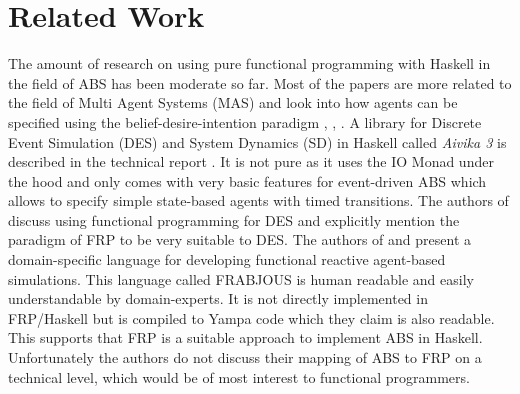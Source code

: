 \section{Related Work}
\label{sec:related_work}
The amount of research on using pure functional programming with Haskell in the field of ABS has been moderate so far. Most of the papers are more related to the field of Multi Agent Systems (MAS) and look into how agents can be specified using the belief-desire-intention paradigm \cite{de_jong_suitability_2014}, \cite{sulzmann_specifying_2007}, \cite{jankovic_functional_2007}. A library for Discrete Event Simulation (DES) and System Dynamics (SD) in Haskell called \textit{Aivika 3} is described in the technical report \cite{sorokin_aivika_2015}. It is not pure as it uses the IO Monad under the hood and only comes with very basic features for event-driven ABS which allows to specify simple state-based agents with timed transitions. The authors of \cite{jankovic_functional_2007} discuss using functional programming for DES and explicitly mention the paradigm of FRP to be very suitable to DES. The authors of \cite{schneider_towards_2012} and \cite{vendrov_frabjous:_2014} present a domain-specific language for developing functional reactive agent-based simulations. This language called FRABJOUS is human readable and easily understandable by domain-experts. It is not directly implemented in FRP/Haskell but is compiled to Yampa code which they claim is also readable. This supports that FRP is a suitable approach to implement ABS in Haskell. Unfortunately the authors do not discuss their mapping of ABS to FRP on a technical level, which would be of most interest to functional programmers.

\begin{comment}
In his talk \cite{sweeney_next_2006}, Tim Sweeney CTO of Epic Games discussed programming languages in the development of game engines and scripting of game logic. Although the fields of games and ABS seem to be very different, Gregory \cite{gregory_game_2018} defines computer-games as \textit{"[..] soft real-time interactive agent-based computer simulations"} (p. 9) and in the end they have also very important similarities: both are simulations which perform numerical computations and update objects in a loop either concurrently or sequential. In games these objects are called \textit{game-objects} and in ABS they are called \textit{agents} but they are conceptually the same thing. The two main points Sweeney made were that dependent types could solve most of the run-time failures and that parallelism is the future for performance improvement in games. He distinguishes between pure functional algorithms which can be parallelized easily in a pure functional language and updating game-objects concurrently using software transactional memory (STM).
The thesis of \cite{bezirgiannis_improving_2013} constructs two frameworks: an agent-modelling framework and a DES framework, both written in Haskell. They put special emphasis on parallel and concurrency in their work. The author develops two programs with strong emphasis on parallelism: HLogo which is a clone of the NetLogo agent-modelling framework and HDES, a framework for discrete event simulation.
\end{comment}

